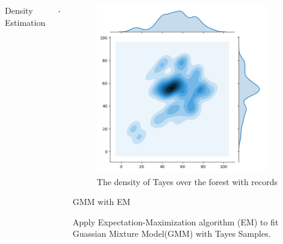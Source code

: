 \documentclass[final]{beamer}
\begin{document}
\begin{frame}
\begin{columns}[t]
\begin{column}{\colwidth}
\begin{tcolorbox}[width=\colwidth,height=\contentheight,top=.2in]
\begin{block}{Density Estimation}
\end{block}

\end{tcolorbox}
\end{column}

\begin{column}{\marginwidth-\parsep}\end{column} %

\begin{column}{\colwidth} %
\begin{tcolorbox}[width=\colwidth,height=\contentheight,top=.2in]

\begin{figure}[H]
\includegraphics[width=0.9\textwidth]{density}
\caption{The density of Tayes over the forest with records}
\end{figure}

\begin{block}{GMM with EM}

Apply Expectation-Maximization algorithm (EM) to fit Guassian Mixture Model(GMM) with Tayes Samples.


\end{block}
\end{tcolorbox}
\end{column}
\end{columns}
\end{frame}
\end{document}
